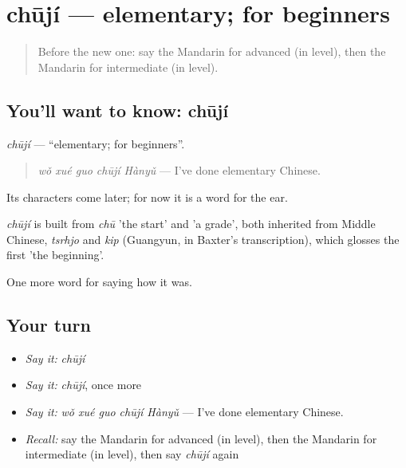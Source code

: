 \section[chūjí]{chūjí — elementary; for beginners}

\label{lesson:ZH-C496-chuji}



\begin{quote}
Before the new one: say the Mandarin for advanced (in level), then the Mandarin for intermediate (in level).
\end{quote}

\subsection*{You'll want to know: chūjí}
\emph{chūjí} — \textquotedblleft{}elementary; for beginners\textquotedblright{}.

\begin{quote}
\emph{wǒ xué guo chūjí Hànyǔ} — I've done elementary Chinese.
\end{quote}

Its characters come later; for now it is a word for the ear.

\begin{cousinweb}
\emph{chūjí} is built from \emph{chū} 'the start' and  'a grade', both inherited from Middle Chinese, \emph{tsrhjo} and \emph{kip} (Guangyun, in Baxter's transcription), which glosses the first 'the beginning'.
\end{cousinweb}

\begin{grammarlens}[title={What you've built}]
One more word for saying how it was.
\end{grammarlens}

\subsection*{Your turn}
\begin{itemize}
\raggedright
  \item \emph{Say it:} \emph{chūjí}
  \item \emph{Say it:} \emph{chūjí}, once more
  \item \emph{Say it:} \emph{wǒ xué guo chūjí Hànyǔ} — I've done elementary Chinese.
  \item \emph{Recall:} say the Mandarin for advanced (in level), then the Mandarin for intermediate (in level), then say \emph{chūjí} again
\end{itemize}

